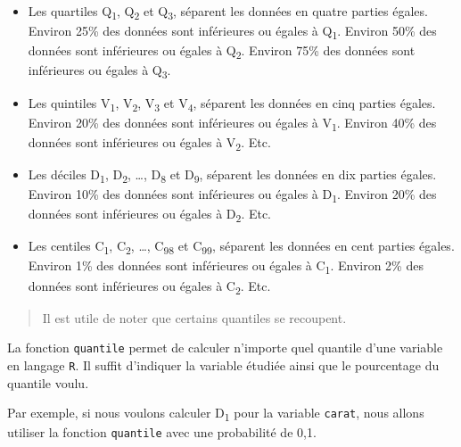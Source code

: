 \documentclass[]{book}
\newenvironment{Shaded}{\begin{snugshade}}{\end{snugshade}}
\newcommand{\KeywordTok}[1]{\textcolor[rgb]{0.13,0.29,0.53}{\textbf{#1}}}
\newcommand{\FloatTok}[1]{\textcolor[rgb]{0.00,0.00,0.81}{#1}}
\newcommand{\OperatorTok}[1]{\textcolor[rgb]{0.81,0.36,0.00}{\textbf{#1}}}
\newcommand{\NormalTok}[1]{#1}
\providecommand{\tightlist}{%
  \setlength{\itemsep}{0pt}\setlength{\parskip}{0pt}}
\begin{document}
\begin{itemize}
\tightlist
\item
  Les quartiles Q\textsubscript{1}, Q\textsubscript{2} et
  Q\textsubscript{3}, séparent les données en quatre parties égales.
  Environ 25\% des données sont inférieures ou égales à
  Q\textsubscript{1}. Environ 50\% des données sont inférieures ou
  égales à Q\textsubscript{2}. Environ 75\% des données sont inférieures
  ou égales à Q\textsubscript{3}.
\item
  Les quintiles V\textsubscript{1}, V\textsubscript{2},
  V\textsubscript{3} et V\textsubscript{4}, séparent les données en cinq
  parties égales. Environ 20\% des données sont inférieures ou égales à
  V\textsubscript{1}. Environ 40\% des données sont inférieures ou
  égales à V\textsubscript{2}. Etc.
\item
  Les déciles D\textsubscript{1}, D\textsubscript{2}, \ldots{},
  D\textsubscript{8} et D\textsubscript{9}, séparent les données en dix
  parties égales. Environ 10\% des données sont inférieures ou égales à
  D\textsubscript{1}. Environ 20\% des données sont inférieures ou
  égales à D\textsubscript{2}. Etc.
\item
  Les centiles C\textsubscript{1}, C\textsubscript{2}, \ldots{},
  C\textsubscript{98} et C\textsubscript{99}, séparent les données en
  cent parties égales. Environ 1\% des données sont inférieures ou
  égales à C\textsubscript{1}. Environ 2\% des données sont inférieures
  ou égales à C\textsubscript{2}. Etc.
\end{itemize}

\begin{quote}
Il est utile de noter que certains quantiles se recoupent.
\end{quote}

La fonction \texttt{quantile} permet de calculer n'importe quel quantile
d'une variable en langage \texttt{R}. Il suffit d'indiquer la variable
étudiée ainsi que le pourcentage du quantile voulu.

Par exemple, si nous voulons calculer D\textsubscript{1} pour la
variable \texttt{carat}, nous allons utiliser la fonction
\texttt{quantile} avec une probabilité de 0,1.

\begin{Shaded}
\end{Shaded}
\end{document}
